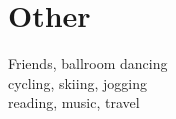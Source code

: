 \documentclass[letterpaper]{deedy-resume} %
\begin{document}
\begin{minipage}[t]{0.33\textwidth}
\sectionspace %
\sectionspace %
\sectionspace %



\section{Other}

Friends, ballroom dancing \\
cycling, skiing, jogging \\
reading, music, travel

\sectionspace %
\sectionspace %
\sectionspace %


\end{minipage} %
\hfill
\end{document}
